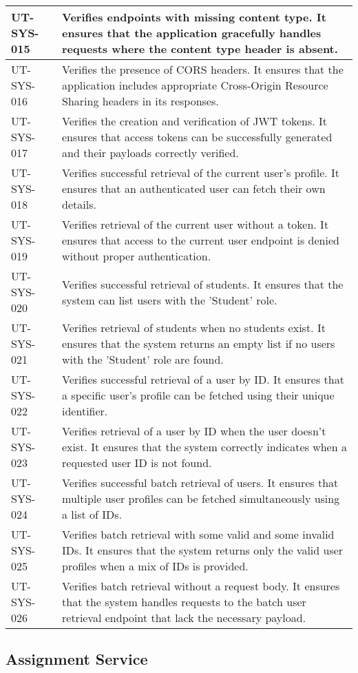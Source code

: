 \begin{longtable}{|p{}|p{}|}
\hline
UT-SYS-015 & Verifies endpoints with missing content type. It ensures that the application gracefully handles requests where the content type header is absent. \\
\hline
UT-SYS-016 & Verifies the presence of CORS headers. It ensures that the application includes appropriate Cross-Origin Resource Sharing headers in its responses. \\
\hline
UT-SYS-017 & Verifies the creation and verification of JWT tokens. It ensures that access tokens can be successfully generated and their payloads correctly verified. \\
\hline
UT-SYS-018 & Verifies successful retrieval of the current user's profile. It ensures that an authenticated user can fetch their own details. \\
\hline
UT-SYS-019 & Verifies retrieval of the current user without a token. It ensures that access to the current user endpoint is denied without proper authentication. \\
\hline
UT-SYS-020 & Verifies successful retrieval of students. It ensures that the system can list users with the 'Student' role. \\
\hline
UT-SYS-021 & Verifies retrieval of students when no students exist. It ensures that the system returns an empty list if no users with the 'Student' role are found. \\
\hline
UT-SYS-022 & Verifies successful retrieval of a user by ID. It ensures that a specific user's profile can be fetched using their unique identifier. \\
\hline
UT-SYS-023 & Verifies retrieval of a user by ID when the user doesn't exist. It ensures that the system correctly indicates when a requested user ID is not found. \\
\hline
UT-SYS-024 & Verifies successful batch retrieval of users. It ensures that multiple user profiles can be fetched simultaneously using a list of IDs. \\
\hline
UT-SYS-025 & Verifies batch retrieval with some valid and some invalid IDs. It ensures that the system returns only the valid user profiles when a mix of IDs is provided. \\
\hline
UT-SYS-026 & Verifies batch retrieval without a request body. It ensures that the system handles requests to the batch user retrieval endpoint that lack the necessary payload. \\
\hline
\end{longtable}

\subsection{Assignment Service}

